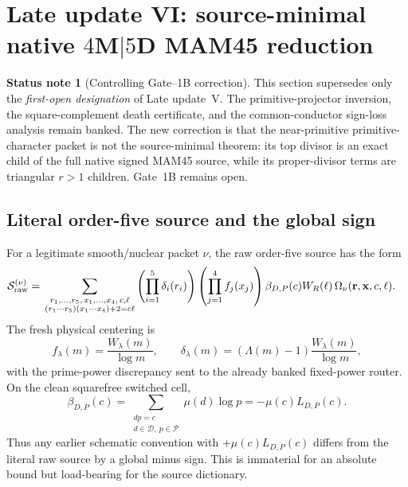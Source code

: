 \documentclass[11pt]{article}
\theoremstyle{definition}
\newtheorem{status}[status]{Status note}
\newcommand{\1}{\mathbf 1}
\begin{document}
\section{Late update VI: source-minimal native \texorpdfstring{$4$M$\mid5$D}{4M|5D} MAM45 reduction}
\label{app:mam45-native}

\begin{status}[Controlling Gate--1B correction]
This section supersedes only the \emph{first-open designation} of Late
update~V.  The primitive-projector inversion, the square-complement death
certificate, and the common-conductor sign-loss analysis remain banked.  The
new correction is that the near-primitive primitive-character packet is not
the source-minimal theorem: its top divisor is an exact child of the full
native signed MAM45 source, while its proper-divisor terms are triangular
$r>1$ children.  Gate~1B remains open.
\end{status}

\subsection{Literal order-five source and the global sign}
For a legitimate smooth/nuclear packet $\nu$, the raw order-five source has the
form
\begin{equation}
\begin{aligned}
 \mathcal S_{\rm raw}^{(\nu)}={}&
 \sum_{\substack{r_1,\ldots,r_5,\,x_1,\ldots,x_4,\,c,\ell\\
 (r_1\cdots r_5)(x_1\cdots x_4)+2=c\ell}}
 \left(\prod_{i=1}^{5}\delta_i(r_i)\right)
 \left(\prod_{j=1}^{4}f_j(x_j)\right)
 \beta_{D,P}(c)W_R(\ell)\,
 \Omega_\nu(\mathbf r,\mathbf x,c,\ell).
\end{aligned}
\label{eq:d14-raw-source}
\end{equation}
The fresh physical centering is
\[
 f_\lambda(m)=\frac{W_\lambda(m)}{\log m},\qquad
 \delta_\lambda(m)=(\Lambda(m)-1)\frac{W_\lambda(m)}{\log m},
\]
with the prime-power discrepancy sent to the already banked fixed-power
router.  On the clean squarefree switched cell,
\begin{equation}
 \beta_{D,P}(c)
 =\sum_{\substack{dp=c\\d\in\mathcal D,\ p\in\mathcal P}}
   \mu(d)\log p
 =-\mu(c)L_{D,P}(c).
\label{eq:d14-beta-sign}
\end{equation}
Thus any earlier schematic convention with $+\mu(c)L_{D,P}(c)$ differs from
the literal raw source by a global minus sign.  This is immaterial for an
absolute bound but load-bearing for the source dictionary.
\end{document}
